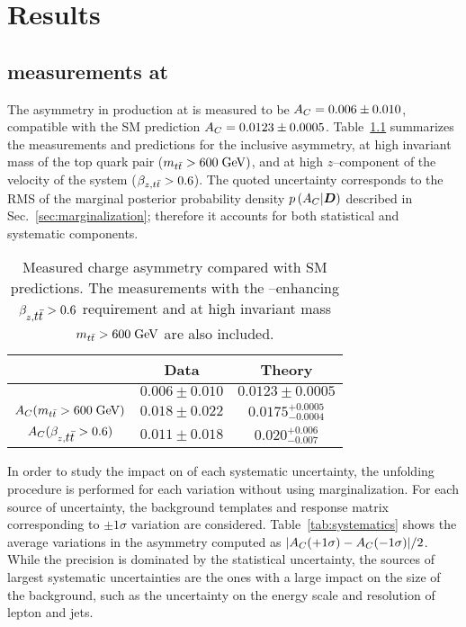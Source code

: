 \chapter{Results}
\label{sec:results}


\section{\ac{} measurements at \seventev{}}
\label{sec:res7tev}

The asymmetry \ac{} in \ttbar{} production at \seventev{} is measured to be
$\mbox{$A_C$}{}= 0.006\pm0.010$, compatible with the SM prediction
$\mbox{$A_C$}{}=0.0123\pm0.0005$.
Table~\ref{tab:results} summarizes the
measurements and predictions for the inclusive asymmetry, at high
invariant mass of the top quark pair ($\mbox{$m_{t\bar{t}}$}{} >600 \; \mathrm{GeV}{})$, and at
high $z$--component of the velocity of the \ttbar{} system ($\mbox{$\beta_{z,t\bar{t}}$}{}>0.6$).
The quoted uncertainty corresponds to the RMS of the marginal posterior
probability density $p\left(\mbox{$A_C$}{}|\boldsymbol{D}{}\right)$ described in
Sec.~\ref{sec:marginalization}; therefore it accounts for both
statistical and systematic components.

\begin{table}[!htb]\centering
\begin{tabular}{c c c}
\toprule
  & Data & Theory\\
\midrule
 \ac{}                                     & $0.006\pm0.010$ & $0.0123\pm0.0005$ \\
 $\mbox{$A_C$}{}(\mbox{$m_{t\bar{t}}$}{} > 600 \; \mathrm{GeV}{})$ & $0.018\pm0.022$ & $0.0175^{+0.0005}_{-0.0004}$\\
 $\mbox{$A_C$}{}(\beta_{z,\mbox{$t\bar{t}$}}>0.6)$   & $0.011\pm0.018$ & $0.020^{+0.006}_{-0.007}$\\
\bottomrule
\end{tabular}
\caption{Measured charge asymmetry \ac{} compared with SM
  predictions. The measurements with the \qqbar{}--enhancing
  $\beta_{z,\mbox{$t\bar{t}$}} > 0.6$ requirement and at high \ttbar{} invariant
  mass $\mbox{$m_{t\bar{t}}$}{} > 600 \; \mathrm{GeV}{}$ are also included.}
\label{tab:results}
\end{table}

In order to study the impact on \ac{} of each systematic uncertainty,
the unfolding procedure is performed for each variation without using
marginalization. 
For each source of uncertainty, the background templates and
response matrix corresponding to $\pm1\sigma$ variation are
considered. 
Table~\ref{tab:systematics} shows the average variations in the
asymmetry computed as $|\mbox{$A_C$}{}(+1\sigma)-\mbox{$A_C$}{}(-1\sigma)|/2$.
While the precision is dominated by the statistical uncertainty, the
sources of largest systematic uncertainties are the ones with a large
impact on the size of the \wjets{} background, such as the
uncertainty on the energy scale and resolution of lepton and jets. 

